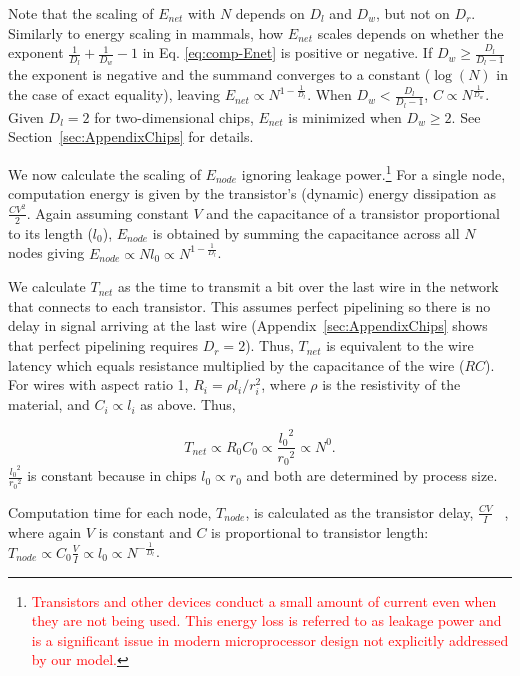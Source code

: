 \documentclass[12pt]{article}
\newcommand{\red}[1]{\textcolor{red}{#1}}
\begin{document}
\noindent Note that the scaling of $E_{net} $ with $N$ depends on $D_l$ and
$D_w$, but not on $D_r$. Similarly to energy scaling in
mammals, how $E_{net}$ scales depends on whether the exponent
$\frac{1}{D_l} + \frac{1}{D_w}-1$ in Eq. \ref {eq:comp-Enet} is positive or
negative.  If $D_w \geq \frac{D_l}{D_l -1}$ the exponent is negative and the
summand converges to a constant ($\log(N)$ in the case of exact equality),
leaving $E_{net} \propto N^{1-\frac{1}{D_l}}$. When $D_w < \frac{D_l}{D_l -1}$,
$C \propto N^{\frac{1}{D_w}}$. Given $D_l = 2$ for two-dimensional chips, $E_{net}$
is minimized when $D_w \geq 2$. See Section~\ref{sec:AppendixChips} for
details.

We now calculate the scaling of $E_{node}$ ignoring leakage
power.\footnote{\red{Transistors and other devices conduct a small amount
  of current even when they are not being used. This energy loss is referred
  to as leakage power and is a significant issue in modern
  microprocessor design not explicitly addressed by our model.}}
For a single node, computation
energy is given by the transistor's (dynamic) energy dissipation as
$\frac{CV^2}{2}$. Again assuming constant $V$ and the capacitance of a
transistor proportional to its length ($l_0$), $E_{node}$ is obtained
by summing
the capacitance across all $N$ nodes giving $E_{node} \propto N l_0  \propto
N^{1-\frac{1}{D_l}}$. 

We calculate $T_{net}$ as the time to transmit a bit over the last 
wire
in the network that connects to each transistor. This assumes perfect
pipelining so there is no delay in signal arriving at the last wire
(Appendix~\ref{sec:AppendixChips} shows that perfect pipelining requires $D_r =
2$). Thus, $T_{net}$ is equivalent to the wire latency which equals resistance
multiplied by the capacitance of the wire ($RC$). For wires with aspect ratio
1, $R_i = \rho l_i /r_i^2$, where $\rho$ is the resistivity of the material,
and $C_i \propto l_i$ as above.  Thus, 

\begin{equation}
\label{eq:comp-Tnet}
T_{net} \propto R_0C_0 \propto
\frac{{l_0}^2}{{r_0}^2} \propto N^0 .
\end {equation}
\noindent $ \frac{{l_0}^2}{{r_0}^2}$ is constant
because in chips  $l_0 \propto r_0$ and both are determined by process size.

Computation time for each node, $T_{node}$, is calculated as the transistor
delay, $\frac{CV}{I}$ ~\cite{bakoglu90}, where again $V$ is constant and $C$ is
proportional to transistor length: $T_{node} \propto C_0 \frac{V}{I}  \propto
l_0  \propto N^{-\frac{1}{D_l}}$. 
\end{document}

